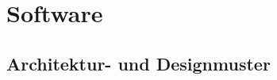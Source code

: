 %
%
%
%
%

\section{Software}

\label{sec:architecture_design_pattern}
\subsection{Architektur- und Designmuster}

